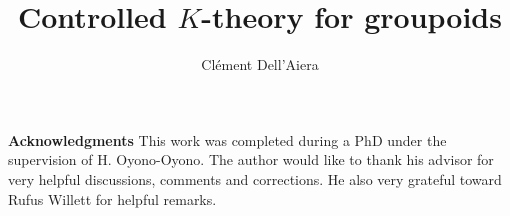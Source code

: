 \documentclass[a4paper,10pt]{article}
\title{Controlled $K$-theory for groupoids}
\date{}
\author{ Clément Dell'Aiera}
\begin{document}
\maketitle
\tableofcontents
\vspace{0.5 cm}
\textbf{Acknowledgments} This work was completed during a PhD under the supervision of H. Oyono-Oyono. The author would like to thank his advisor for very helpful discussions, comments and corrections. He also very grateful toward Rufus Willett for helpful remarks. 






%


 
\end{document}
